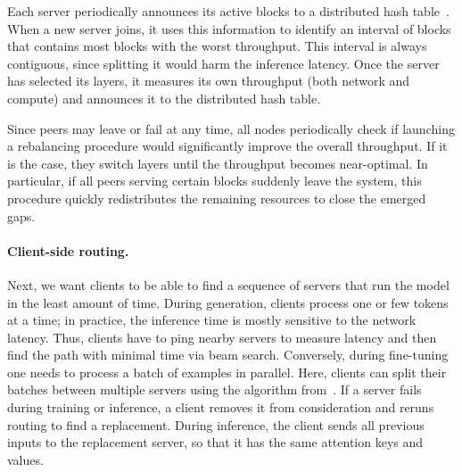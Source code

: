Each server periodically announces its active blocks to a distributed hash table~\cite{kademlia}. When a new server joins, it uses this information to identify an interval of blocks that contains most blocks with the worst throughput. This interval is always contiguous, since splitting it would harm the inference latency. Once the server has selected its layers, it measures its own throughput (both network and compute) and announces it to the distributed hash table. %

Since peers may leave or fail at any time, all nodes periodically check if launching a rebalancing procedure would significantly improve the overall throughput. If it is the case, they switch layers until the throughput becomes near-optimal. In particular, if all peers serving certain blocks suddenly leave the system, this procedure quickly redistributes the remaining resources to close the emerged gaps.



\paragraph{Client-side routing.} Next, we want clients to be able to find a sequence of servers that run the model in the least amount of time. During generation, clients process one or few tokens at a time; in practice, the inference time is mostly sensitive to the network latency. Thus, clients have to ping nearby servers to measure latency and then find the path with minimal time via beam search. Conversely, during fine-tuning one needs to process a batch of examples in parallel. %
Here, clients can split their batches between multiple servers using the algorithm from~\citet{ryabinin2021swarm}.
If a server fails during training or inference, a client removes it from consideration and reruns routing to find a replacement. During inference, the client sends all previous inputs to the replacement server, so that it has the same attention keys and values.


